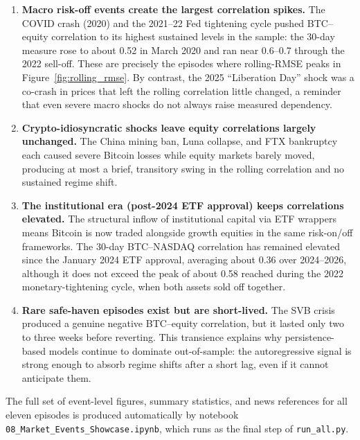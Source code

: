\begin{enumerate}
    \item \textbf{Macro risk-off events create the largest correlation spikes.}
    The COVID crash (2020) and the 2021--22 Fed tightening cycle pushed BTC--equity
    correlation to its highest sustained levels in the sample: the 30-day measure rose
    to about 0.52 in March 2020 and ran near 0.6--0.7 through the 2022 sell-off. These
    are precisely the episodes where rolling-RMSE peaks in Figure~\ref{fig:rolling_rmse}.
    By contrast, the 2025 ``Liberation Day'' shock was a co-crash in prices that left the
    rolling correlation little changed, a reminder that even severe macro shocks do
    not always raise measured dependency.

    \item \textbf{Crypto-idiosyncratic shocks leave equity correlations largely unchanged.}
    The China mining ban, Luna collapse, and FTX bankruptcy each caused severe Bitcoin
    losses while equity markets barely moved, producing at most a brief, transitory
    swing in the rolling correlation and no sustained regime shift.

    \item \textbf{The institutional era (post-2024 ETF approval) keeps correlations elevated.}
    The structural inflow of institutional capital via ETF wrappers means Bitcoin is
    now traded alongside growth equities in the same risk-on/off frameworks. The 30-day
    BTC--NASDAQ correlation has remained elevated since the January 2024 ETF approval,
    averaging about 0.36 over 2024--2026, although it does not exceed the peak of about
    0.58 reached during the 2022 monetary-tightening cycle, when both assets sold off together.

    \item \textbf{Rare safe-haven episodes exist but are short-lived.}
    The SVB crisis produced a genuine negative BTC--equity correlation, but it lasted
    only two to three weeks before reverting. This transience explains why persistence-based
    models continue to dominate out-of-sample: the autoregressive signal is strong
    enough to absorb regime shifts after a short lag, even if it cannot anticipate them.
\end{enumerate}

The full set of event-level figures, summary statistics, and news references for all
eleven episodes is produced automatically by notebook
\texttt{08\_Market\_Events\_Showcase.ipynb}, which runs as the final step of
\texttt{run\_all.py}.

\clearpage
